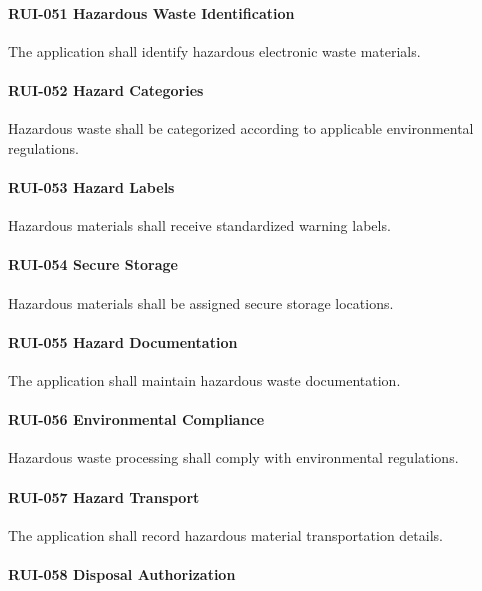 \paragraph{RUI-051 Hazardous Waste Identification}

The application shall identify hazardous electronic waste materials.

\paragraph{RUI-052 Hazard Categories}

Hazardous waste shall be categorized according to applicable
environmental regulations.

\paragraph{RUI-053 Hazard Labels}

Hazardous materials shall receive standardized warning labels.

\paragraph{RUI-054 Secure Storage}

Hazardous materials shall be assigned secure storage locations.

\paragraph{RUI-055 Hazard Documentation}

The application shall maintain hazardous waste documentation.

\paragraph{RUI-056 Environmental Compliance}

Hazardous waste processing shall comply with environmental regulations.

\paragraph{RUI-057 Hazard Transport}

The application shall record hazardous material transportation details.

\paragraph{RUI-058 Disposal Authorization}

